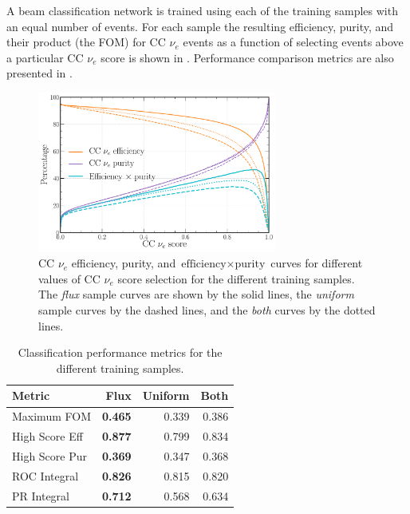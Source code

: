 A beam classification network is trained using each of the training samples with an equal number
of events. For each sample the resulting efficiency, purity, and their product (the FOM) for CC
$\nu_{e}$ events as a function of selecting events above a particular CC $\nu_{e}$ score is shown
in . Performance comparison metrics are also presented in
.

\begin{figure} %
    \includegraphics[width=0.7\textwidth]{diagrams/7-results/sample_nuel_eff_curves.pdf}
    \caption[CC $\nu_{e}$ efficiency and purity curves for different training samples]
    {CC $\nu_{e}$ efficiency, purity, and $\text{efficiency}\times\text{purity}$ curves for
        different values of CC $\nu_{e}$ score selection for the different training samples. The
        \emph{flux} sample curves are shown by the solid lines, the \emph{uniform} sample curves
        by the dashed lines, and the \emph{both} curves by the dotted lines.}
    \label{fig:sample_nuel_eff_curves}
\end{figure}

\begin{table} %
    \begin{tabular}{lrrr}
        Metric         & Flux           & Uniform & Both  \\
        \midrule
        Maximum FOM    & \textbf{0.465} & 0.339   & 0.386 \\
        High Score Eff & \textbf{0.877} & 0.799   & 0.834 \\
        High Score Pur & \textbf{0.369} & 0.347   & 0.368 \\
        ROC Integral   & \textbf{0.826} & 0.815   & 0.820 \\
        PR Integral    & \textbf{0.712} & 0.568   & 0.634 \\
    \end{tabular}
    \caption[Classification performance metrics for different training samples]
    {Classification performance metrics for the different training samples.}
    \label{tab:sample}
\end{table}

